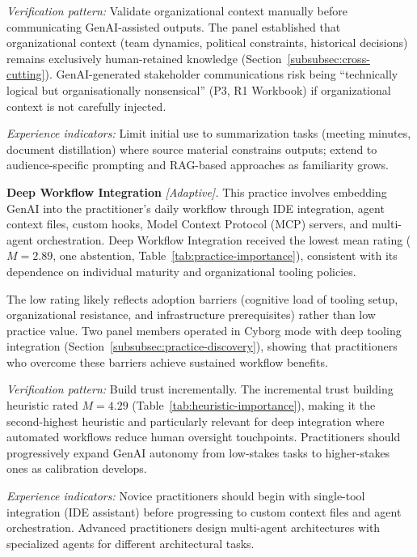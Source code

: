\textit{Verification pattern:} Validate organizational context manually before
communicating GenAI-assisted outputs. The panel established that organizational
context (team dynamics, political constraints, historical decisions) remains
exclusively human-retained knowledge
(Section~\ref{subsubsec:cross-cutting}). GenAI-generated stakeholder
communications risk being ``technically logical but organisationally
nonsensical'' (P3, R1 Workbook) if organizational context is not carefully
injected.

\textit{Experience indicators:} Limit initial use to summarization tasks
(meeting minutes, document distillation) where source material constrains
outputs; extend to audience-specific prompting and RAG-based approaches as
familiarity grows.

\textbf{Deep Workflow Integration} \textit{[Adaptive].}
This practice involves embedding GenAI into the practitioner's daily workflow
through IDE integration, agent context files, custom hooks, Model Context
Protocol (MCP) servers, and multi-agent orchestration. Deep Workflow Integration
received the lowest mean rating ($M = 2.89$, one abstention,
Table~\ref{tab:practice-importance}), consistent with its dependence on
individual maturity and organizational tooling policies.

The low rating likely reflects adoption barriers (cognitive load of tooling
setup, organizational resistance, and infrastructure prerequisites) rather than
low practice value. Two panel members operated in Cyborg mode with deep tooling
integration (Section~\ref{subsubsec:practice-discovery}), showing that
practitioners who overcome these barriers achieve sustained workflow benefits.

\textit{Verification pattern:} Build trust incrementally. The incremental trust
building heuristic rated $M = 4.29$ (Table~\ref{tab:heuristic-importance}),
making it the second-highest heuristic and particularly relevant for deep
integration where automated workflows reduce human oversight touchpoints.
Practitioners should progressively expand GenAI autonomy from low-stakes tasks
to higher-stakes ones as calibration develops.

\textit{Experience indicators:} Novice practitioners should begin with
single-tool integration (IDE assistant) before progressing to custom context
files and agent orchestration. Advanced practitioners design multi-agent
architectures with specialized agents for different architectural tasks.

